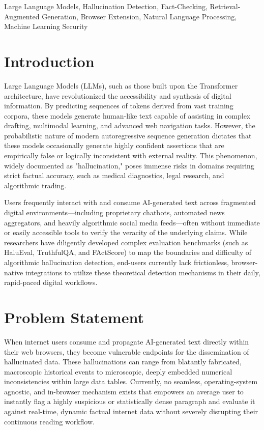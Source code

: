 \documentclass[conference]{IEEEtran}
\begin{document}
\begin{IEEEkeywords}
Large Language Models, Hallucination Detection, Fact-Checking, Retrieval-Augmented Generation, Browser Extension, Natural Language Processing, Machine Learning Security
\end{IEEEkeywords}

\section{Introduction}
Large Language Models (LLMs), such as those built upon the Transformer architecture, have revolutionized the accessibility and synthesis of digital information. By predicting sequences of tokens derived from vast training corpora, these models generate human-like text capable of assisting in complex drafting, multimodal learning, and advanced web navigation tasks. However, the probabilistic nature of modern autoregressive sequence generation dictates that these models occasionally generate highly confident assertions that are empirically false or logically inconsistent with external reality. This phenomenon, widely documented as "hallucination," poses immense risks in domains requiring strict factual accuracy, such as medical diagnostics, legal research, and algorithmic trading.

Users frequently interact with and consume AI-generated text across fragmented digital environments—including proprietary chatbots, automated news aggregators, and heavily algorithmic social media feeds—often without immediate or easily accessible tools to verify the veracity of the underlying claims. While researchers have diligently developed complex evaluation benchmarks (such as HaluEval, TruthfulQA, and FActScore) to map the boundaries and difficulty of algorithmic hallucination detection, end-users currently lack frictionless, browser-native integrations to utilize these theoretical detection mechanisms in their daily, rapid-paced digital workflows.

\section{Problem Statement}
When internet users consume and propagate AI-generated text directly within their web browsers, they become vulnerable endpoints for the dissemination of hallucinated data. These hallucinations can range from blatantly fabricated, macroscopic historical events to microscopic, deeply embedded numerical inconsistencies within large data tables. Currently, no seamless, operating-system agnostic, and in-browser mechanism exists that empowers an average user to instantly flag a highly suspicious or statistically dense paragraph and evaluate it against real-time, dynamic factual internet data without severely disrupting their continuous reading workflow. 
\end{document}
